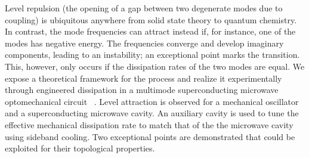 Level repulsion (the opening of a gap between two degenerate modes due to coupling)
  is ubiquitous anywhere
  from solid state theory to quantum chemistry. 
  In contrast, 
  the mode frequencies can attract instead
  if, for instance,
  one of the modes has negative energy.
  The frequencies converge and develop imaginary components,
  leading to an instability;
  an exceptional point marks the transition.
  This, however, only occurs if
  the dissipation rates of the two modes are equal.
  We expose a theoretical framework for the process and
  realize it experimentally
  through engineered dissipation
  in a multimode superconducting microwave optomechanical circuit~%
  \cite{1709.02220v1}.
  Level attraction is observed 
  for a mechanical oscillator and a superconducting microwave cavity.
  An auxiliary cavity is used to tune the effective
  mechanical dissipation rate to match that of the the microwave cavity
  using sideband cooling.
  Two exceptional points are demonstrated that
  could be exploited for their topological properties.